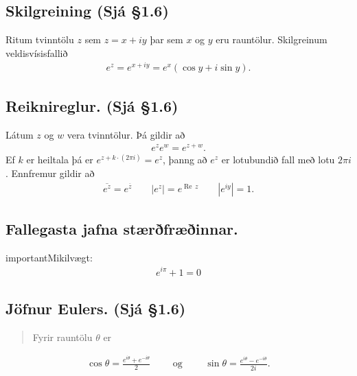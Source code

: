 \documentclass[a4paper,10pt,icelandic]{sphinxmanual}
\begin{document}
\subsection{Skilgreining (Sjá \S{}1.6)}
\label{\detokenize{Kafli01:skilgreining-sja-1-6}}
Ritum tvinntölu \(z\) sem
\(z=x+iy\) þar sem \(x\) og \(y\) eru rauntölur. Skilgreinum
veldisvísisfallið
\begin{equation*}
\begin{split}e^z=e^{x+iy}=e^x(\cos y+i\sin y).\end{split}
\end{equation*}

\subsection{Reiknireglur. (Sjá \S{}1.6)}
\label{\detokenize{Kafli01:reiknireglur-sja-1-6}}
Látum \(z\) og \(w\) vera
tvinntölur. Þá gildir að
\begin{equation*}
\begin{split}e^ze^w=e^{z+w}.\end{split}
\end{equation*}
Ef \(k\) er heiltala þá er \(e^{z+k\cdot(2\pi i)}=e^z\), þanng
að \(e^z\) er lotubundið fall með lotu \(2\pi i\). Ennfremur
gildir að
\begin{equation*}
\begin{split}\overline{e^z}=e^{\overline{z}}\qquad |e^z|=e^{\operatorname{Re\, } z}\qquad |e^{iy}|=1.\end{split}
\end{equation*}

\subsection{Fallegasta jafna stærðfræðinnar.}
\label{\detokenize{Kafli01:fallegasta-jafna-staerfraeinnar}}
\begin{sphinxadmonition}{important}{Mikilvægt:}\begin{equation*}
\begin{split}e^{i\pi}+1=0\end{split}
\end{equation*}\end{sphinxadmonition}


\subsection{Jöfnur Eulers. (Sjá \S{}1.6)}
\label{\detokenize{Kafli01:jofnur-eulers-sja-1-6}}\begin{quote}

Fyrir rauntölu \(\theta\) er
\end{quote}
\begin{equation*}
\begin{split}\cos\theta=\frac{e^{i\theta}+e^{-i\theta}}{2}\qquad\mbox{ og }\qquad
\sin\theta=\frac{e^{i\theta}-e^{-i\theta}}{2i}.\end{split}
\end{equation*}
\end{document}
